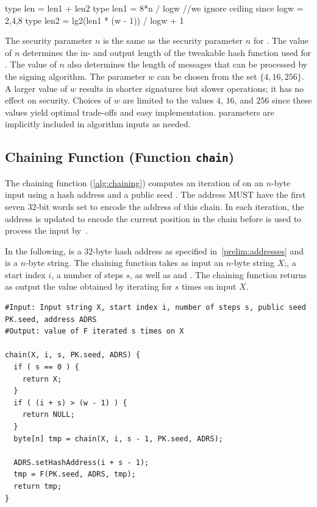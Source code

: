 \begin{code}
  type len = len1 + len2
  type len1 = 8*n / logw //we ignore ceiling since logw = 2,4,8
  type len2 = lg2(len1 * (w - 1)) / logw + 1
\end{code}

The security parameter $n$ is the same as the security parameter $n$ for \spx.
The value of $n$ determines the in- and output length of the tweakable hash
function used for \wotsp. The value of $n$ also determines
the length of messages that can be processed by the \wotsp signing algorithm.
The parameter $w$ can be chosen from the set $\{4, 16, 256\}$.
A larger value of $w$ results in shorter signatures but slower
operations; it has no effect on security.
Choices of $w$ are limited to the values $4$, $16$, and $256$ since these values
yield optimal trade-offs and easy implementation. \wotsp parameters are
implicitly included in algorithm inputs as needed.

\subsection{\wotsp Chaining Function (Function \texttt{chain})}
The chaining function (\autoref{alg:chaining}) computes an iteration of
\sphincsF on an $n$-byte input using a \wotsp hash address \adrs and a
public seed \pseed.
The address \adrs MUST have the first seven $32$-bit words set to encode the
address of this chain.  In each iteration, the address is updated to encode
the current position in the chain before \adrs is used to
process the input by~\sphincsF.

In the following, \adrs is a $32$-byte \wotsp hash address as specified
in~\autoref{prelim:addresses} and
\pseed is a $n$-byte string. The chaining function takes as input an
$n$-byte string $X$;, a start index $i$, a number of steps $s$, as well as \adrs and
\pseed.  The chaining function returns as output the value obtained by iterating
\sphincsF for $s$ times on input $X$.

\begin{lstlisting}[breaklines=true,label=alg:chaining, language=pseudoc,
                   caption=\texttt{chain} -- Chaining function used in \wotsp.]
#Input: Input string X, start index i, number of steps s, public seed PK.seed, address ADRS
#Output: value of F iterated s times on X

chain(X, i, s, PK.seed, ADRS) {
  if ( s == 0 ) {
    return X;
  }
  if ( (i + s) > (w - 1) ) {
    return NULL;
  }
  byte[n] tmp = chain(X, i, s - 1, PK.seed, ADRS);

  ADRS.setHashAddress(i + s - 1);
  tmp = F(PK.seed, ADRS, tmp);
  return tmp;
}
\end{lstlisting}

